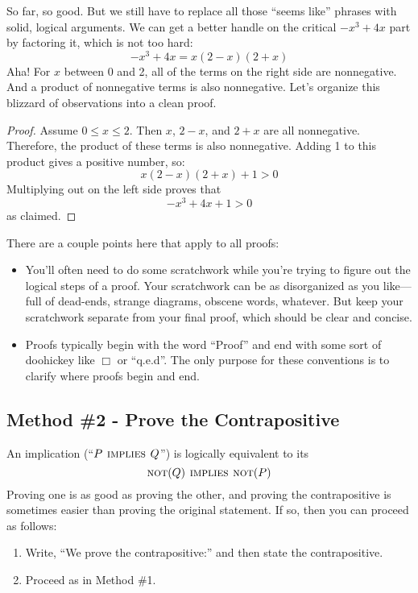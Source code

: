 So far, so good.  But we still have to replace all those ``seems
like'' phrases with solid, logical arguments.  We can get a better
handle on the critical $-x^3 + 4x$ part by factoring it, which is not
too hard:
%
\[
-x^3 + 4x = x (2 - x)(2 + x)
\]
%
Aha!  For $x$ between 0 and 2, all of the terms on the right side are
nonnegative.  And a product of nonnegative terms is also nonnegative.
Let's organize this blizzard of observations into a clean proof.

\begin{proof}
Assume $0 \leq x \leq 2$.  Then $x$, $2 - x$, and $2 + x$ are all
nonnegative.  Therefore, the product of these terms is also
nonnegative.  Adding 1 to this product gives a positive number, so:
%
\[
x (2 - x)(2 + x) + 1 > 0
\]
%
Multiplying out on the left side proves that
%
\[
-x^3 + 4x + 1 > 0
\]
%
as claimed.
\end{proof}

There are a couple points here that apply to all proofs:
%
\begin{itemize}

\item You'll often need to do some scratchwork while you're trying to
figure out the logical steps of a proof.  Your scratchwork can be as
disorganized as you like---full of dead-ends, strange diagrams,
obscene words, whatever.  But keep your scratchwork separate from your
final proof, which should be clear and concise.

\item Proofs typically begin with the word ``Proof'' and end with some
sort of doohickey like $\Box$ or ``q.e.d''.  The only purpose for
these conventions is to clarify where proofs begin and end.

\end{itemize}

\subsection{Method \#2 - Prove the Contrapositive}

An implication (``$P \mathbin{\mathrm{\textsc{\,implies\,}}} Q$'') is logically equivalent to its
\[
\mathop{\mathrm{\textsc{not}}}(Q) \mathbin{\mathrm{\textsc{\,implies\,}}} \mathop{\mathrm{\textsc{not}}}(P)
\]
Proving one is as good as proving the other, and proving the
contrapositive is sometimes easier than proving the original statement.
If so, then you can proceed as follows:
%
\begin{enumerate}
\item Write, ``We prove the contrapositive:'' and then state the
contrapositive.
\item Proceed as in Method \#1.
\end{enumerate}

